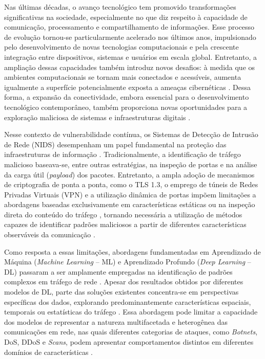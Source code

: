 \par{
	Nas últimas décadas, o avanço tecnológico tem promovido transformações
	significativas na sociedade, especialmente no que diz respeito à capacidade
	de comunicação, processamento e compartilhamento de informações. Esse
	processo de evolução tornou-se particularmente acelerado nos últimos anos,
	impulsionado pelo desenvolvimento de novas tecnologias computacionais e pela
	crescente integração entre dispositivos, sistemas e usuários em escala global.
	Entretanto, a ampliação dessas capacidades também introduz novos desafios: à
	medida que os ambientes computacionais se tornam mais conectados e acessíveis,
	aumenta igualmente a superfície potencialmente exposta a ameaças cibernéticas \cite{cyberrisk2025}.
	Dessa forma, a expansão da conectividade, embora essencial para o desenvolvimento
	tecnológico contemporâneo, também proporciona novas oportunidades para a
	exploração maliciosa de sistemas e infraestruturas digitais \cite{aiimpact2026}.
}

\par{
	Nesse contexto de vulnerabilidade contínua, os Sistemas de Detecção de Intrusão de
	Rede (NIDS) desempenham um papel fundamental na proteção das infraestruturas de
	informação \cite{advancedids2024, p4nids2025}. Tradicionalmente, a identificação de tráfego malicioso baseava-se,
	entre outras estratégias, na inspeção de portas e na análise da carga útil
	(\emph{payload}) dos pacotes. Entretanto, a ampla adoção de mecanismos de
	criptografia de ponta a ponta, como o TLS 1.3, o emprego de túneis de Redes
	Privadas Virtuais (VPN) e a utilização dinâmica de portas impõem limitações a
	abordagens baseadas exclusivamente em características estáticas ou na inspeção
	direta do conteúdo do tráfego \cite{standard2021}, tornando necessária a utilização de métodos capazes
	de identificar padrões maliciosos a partir de diferentes características observáveis
	da comunicação \cite{trafficmoe2026}.
}

\par{
	Como resposta a essas limitações, abordagens fundamentadas em Aprendizado de Máquina
	(\emph{Machine Learning} -- ML) e Aprendizado Profundo (\emph{Deep Learning} -- DL)
	passaram a ser amplamente empregadas na identificação de padrões complexos em tráfego
	de rede \cite{survey2025dl, neuralcyber2025}. Apesar dos resultados obtidos por diferentes modelos de DL, parte das soluções
	existentes concentra-se em perspectivas específicas dos dados, explorando predominantemente
	características espaciais, temporais ou estatísticas do tráfego \cite{timematters2025, temporal2025}. Essa abordagem pode
	limitar a capacidade dos modelos de representar a natureza multifacetada e heterogênea
	das comunicações em rede, nas quais diferentes categorias de ataques, como \emph{Botnets},
	DoS, DDoS e \emph{Scans}, podem apresentar comportamentos distintos em diferentes domínios
	de características \cite{ciciot2023, ugr162021}.
}

